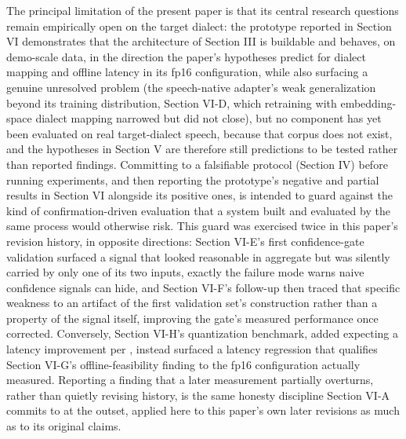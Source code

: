 \documentclass[conference]{IEEEtran}
\begin{document}
The principal limitation of the present paper is that its central research questions remain empirically open on the target dialect: the prototype reported in Section VI demonstrates that the architecture of Section III is buildable and behaves, on demo-scale data, in the direction the paper's hypotheses predict for dialect mapping and offline latency in its fp16 configuration, while also surfacing a genuine unresolved problem (the speech-native adapter's weak generalization beyond its training distribution, Section VI-D, which retraining with embedding-space dialect mapping narrowed but did not close), but no component has yet been evaluated on real target-dialect speech, because that corpus does not exist, and the hypotheses in Section V are therefore still predictions to be tested rather than reported findings. Committing to a falsifiable protocol (Section IV) before running experiments, and then reporting the prototype's negative and partial results in Section VI alongside its positive ones, is intended to guard against the kind of confirmation-driven evaluation that a system built and evaluated by the same process would otherwise risk. This guard was exercised twice in this paper's revision history, in opposite directions: Section VI-E's first confidence-gate validation surfaced a signal that looked reasonable in aggregate but was silently carried by only one of its two inputs, exactly the failure mode \cite{intrygue2026} warns naive confidence signals can hide, and Section VI-F's follow-up then traced that specific weakness to an artifact of the first validation set's construction rather than a property of the signal itself, improving the gate's measured performance once corrected. Conversely, Section VI-H's quantization benchmark, added expecting a latency improvement per \cite{compactllm2026}, instead surfaced a latency regression that qualifies Section VI-G's offline-feasibility finding to the fp16 configuration actually measured. Reporting a finding that a later measurement partially overturns, rather than quietly revising history, is the same honesty discipline Section VI-A commits to at the outset, applied here to this paper's own later revisions as much as to its original claims.
\end{document}
